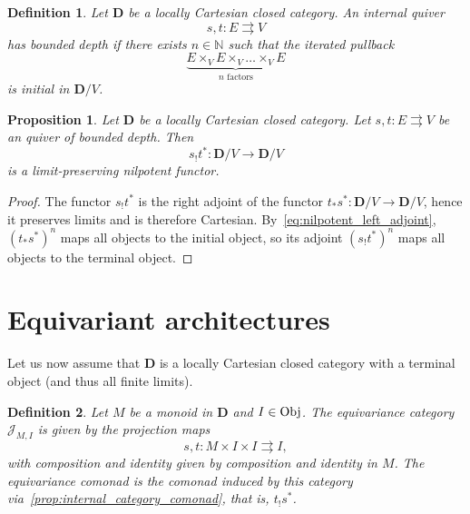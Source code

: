 \documentclass[12pt]{article}
\newtheorem{definition}{Definition}
\newtheorem{proposition}{Proposition}
\newcommand{\N}{{\mathbb{N}}}
\newcommand{\Obj}{{\textnormal{Obj}}}
\newcommand{\DCat}{{\mathbf{D}}}
\newcommand{\JCat}{{\mathcal{J}}}
\begin{document}
\begin{definition}\label{def:internal_quiver_bounded_depth}
    Let $\DCat$ be a locally Cartesian closed category. An internal quiver
    \begin{equation*}
        s, t\colon E \rightrightarrows V
    \end{equation*}
    {\em has bounded depth} if there exists $n \in \N$ such that the iterated pullback
    \begin{equation}\label{eq:nilpotent_left_adjoint}
        \underbrace{E \times_V E \times_V \dots \times_V E}_{n \text{ factors}}
    \end{equation}
    is initial in $\DCat/V$.
\end{definition}

\begin{proposition}\label{prop:internal_quiver_functor}
    Let $\DCat$ be a locally Cartesian closed category. Let $s, t\colon E \rightrightarrows V$ be an quiver of bounded depth. Then
    \begin{equation*}
        s_!t^*\colon \DCat/V \rightarrow \DCat/V
    \end{equation*}
    is a limit-preserving nilpotent functor.
\end{proposition}

\begin{proof}
    The functor $s_!t^*$ is the right adjoint of the functor  $t_*s^*\colon \DCat/V \rightarrow \DCat/V$, hence it preserves limits and is therefore Cartesian. By~\cref{eq:nilpotent_left_adjoint}, $(t_*s^*)^n$ maps all objects to the initial object, so its adjoint $(s_!t^*)^n$ maps all objects to the terminal object.
\end{proof}

\section{Equivariant architectures}

Let us now assume that $\DCat$  is a locally Cartesian closed category with a terminal object (and thus all finite limits).

\begin{definition}\label{def:equivariance_category}
    Let $M$ be a monoid in $\DCat$ and $I \in \Obj$. The {\em equivariance category} $\JCat_{M, I}$ is given by the projection maps
    \begin{equation*}
        s, t\colon M \times I \times I \rightrightarrows I,
    \end{equation*}
    with composition and identity given by composition and identity in $M$. The {\em equivariance comonad} is the comonad induced by this category via~\cref{prop:internal_category_comonad}, that is, $t_!s^*$.
\end{definition}
\end{document}
